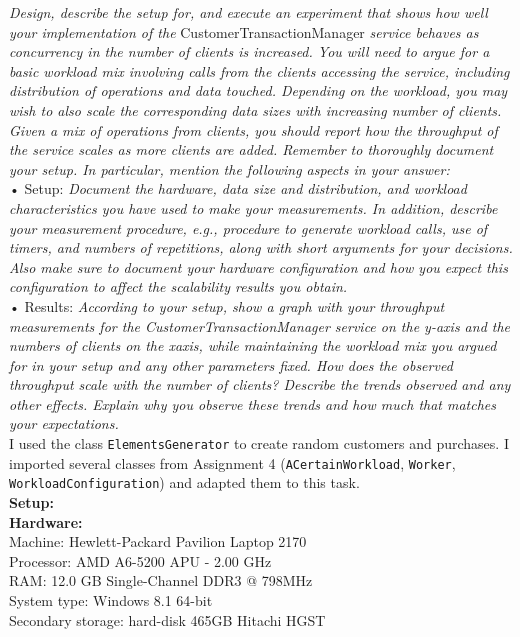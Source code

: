 \documentclass[paper=a4, fontsize=11pt]{scrartcl} %
\numberwithin{equation}{section} %
\numberwithin{figure}{section} %
\numberwithin{table}{section} %
\begin{document}
\textit{Design, describe the setup for, and execute an experiment that shows how well your
implementation of the }CustomerTransactionManager\textit{ service behaves as concurrency in the
number of clients is increased. You will need to argue for a basic workload mix involving calls from the
clients accessing the service, including distribution of operations and data touched. Depending on the
workload, you may wish to also scale the corresponding data sizes with increasing number of clients.
Given a mix of operations from clients, you should report how the throughput of the service scales as
more clients are added. Remember to thoroughly document your setup. In particular, mention the
following aspects in your answer:}\\
• Setup: \textit{Document the hardware, data size and distribution, and workload characteristics you
have used to make your measurements. In addition, describe your measurement procedure, e.g.,
procedure to generate workload calls, use of timers, and numbers of repetitions, along with short
arguments for your decisions. Also make sure to document your hardware configuration and how
you expect this configuration to affect the scalability results you obtain.}\\
• Results:\textit{ According to your setup, show a graph with your throughput measurements for the
CustomerTransactionManager service on the y-axis and the numbers of clients on the xaxis,
while maintaining the workload mix you argued for in your setup and any other parameters
fixed. How does the observed throughput scale with the number of clients? Describe the trends
observed and any other effects. Explain why you observe these trends and how much that matches
your expectations.
}\\
I used the class \verb|ElementsGenerator| to create random customers and purchases. I imported several classes from Assignment 4 (\verb|ACertainWorkload|, \verb|Worker|, \verb|WorkloadConfiguration|) and adapted them to this task.\\
\textbf{Setup:}\\
\textbf{Hardware:}\\
Machine: Hewlett-Packard Pavilion Laptop 2170 \\
Processor: AMD A6-5200 APU - 2.00 GHz\\
RAM: 12.0 GB Single-Channel DDR3 @ 798MHz\\
System type: Windows 8.1 64-bit\\
Secondary storage: hard-disk 465GB Hitachi HGST \\
\end{document}
